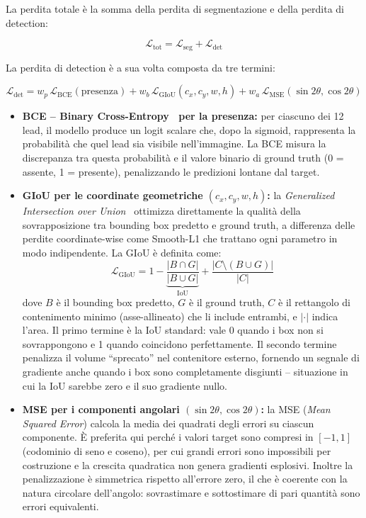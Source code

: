 La perdita totale è la somma della perdita di segmentazione e della perdita di detection:

\[
    \mathcal{L}_{\text{tot}} = \mathcal{L}_{\text{seg}} + \mathcal{L}_{\text{det}}
\]

La perdita di detection è a sua volta composta da tre termini:

\[
    \mathcal{L}_{\text{det}} = w_p\,\mathcal{L}_{\text{BCE}}(\text{presenza}) + w_b\,\mathcal{L}_{\text{GIoU}}(c_x,c_y,w,h) + w_a\,\mathcal{L}_{\text{MSE}}(\sin 2\theta, \cos 2\theta)
\]

\begin{itemize}
    \item \textbf{BCE -- Binary Cross-Entropy~\cite{goodfellow2016} per la presenza:} per ciascuno dei 12 lead, il modello produce un logit scalare che, dopo la sigmoid, rappresenta la probabilità che quel lead sia visibile nell'immagine. La BCE misura la discrepanza tra questa probabilità e il valore binario di ground truth (0 = assente, 1 = presente), penalizzando le predizioni lontane dal target.

    \item \textbf{GIoU per le coordinate geometriche $(c_x, c_y, w, h)$:} la \textit{Generalized Intersection over Union}~\cite{DBLP:journals/corr/abs-1902-09630} ottimizza direttamente la qualità della sovrapposizione tra bounding box predetto e ground truth, a differenza delle perdite coordinate-wise come Smooth-L1 che trattano ogni parametro in modo indipendente. La GIoU è definita come:
    \[
        \mathcal{L}_{\text{GIoU}} = 1 - \underbrace{\frac{|B \cap G|}{|B \cup G|}}_{\text{IoU}} + \frac{|C \setminus (B \cup G)|}{|C|}
    \]
    dove $B$ è il bounding box predetto, $G$ è il ground truth, $C$ è il rettangolo di contenimento minimo (asse-allineato) che li include entrambi, e $|\cdot|$ indica l'area. Il primo termine è la IoU standard: vale 0 quando i box non si sovrappongono e 1 quando coincidono perfettamente. Il secondo termine penalizza il volume ``sprecato'' nel contenitore esterno, fornendo un segnale di gradiente anche quando i box sono completamente disgiunti -- situazione in cui la IoU sarebbe zero e il suo gradiente nullo.

    \item \textbf{MSE per i componenti angolari $(\sin 2\theta, \cos 2\theta)$:} la MSE (\textit{Mean Squared Error}) calcola la media dei quadrati degli errori su ciascun componente. È preferita qui perché i valori target sono compresi in $[-1, 1]$ (codominio di seno e coseno), per cui grandi errori sono impossibili per costruzione e la crescita quadratica non genera gradienti esplosivi. Inoltre la penalizzazione è simmetrica rispetto all'errore zero, il che è coerente con la natura circolare dell'angolo: sovrastimare e sottostimare di pari quantità sono errori equivalenti.
\end{itemize}

